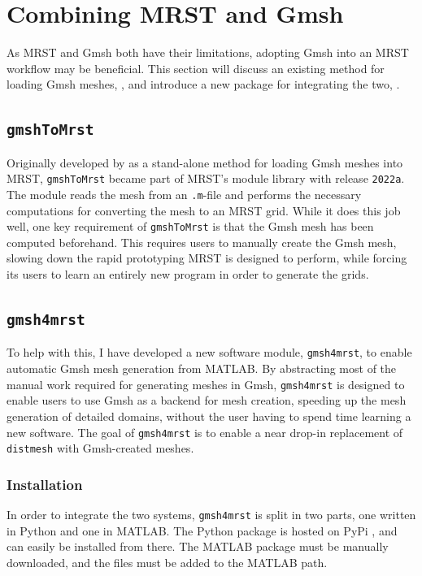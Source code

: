 \section{Combining MRST and Gmsh}
\label{sec:combining}
As MRST and Gmsh both have their limitations, adopting Gmsh into an MRST workflow may be beneficial. This section will discuss an existing method for loading Gmsh meshes, , and introduce a new package for integrating the two, .

\subsection{\texttt{gmshToMrst}}
\label{sec:GmshToMRST}
Originally developed by \textcite{gmsh_to_mrst} as a stand-alone method for loading Gmsh meshes into MRST, \verb|gmshToMrst| became part of MRST's module library with release \verb|2022a|. The module reads the mesh from an \verb|.m|-file and performs the necessary computations for converting the mesh to an MRST grid. While it does this job well, one key requirement of \verb|gmshToMrst| is that the Gmsh mesh has been computed beforehand. This requires users to manually create the Gmsh mesh, slowing down the rapid prototyping MRST is designed to perform, while forcing its users to learn an entirely new program in order to generate the grids.


\subsection{\texttt{gmsh4mrst}}
\label{sec:own_software}
To help with this, I have developed a new software module, \verb|gmsh4mrst|, to enable automatic Gmsh mesh generation from MATLAB. By abstracting most of the manual work required for generating meshes in Gmsh, \verb|gmsh4mrst| is designed to enable users to use Gmsh as a backend for mesh creation, speeding up the mesh generation of detailed domains, without the user having to spend time learning a new software. The goal of \verb|gmsh4mrst| is to enable a near drop-in replacement of \verb|distmesh| with Gmsh-created meshes.


\subsubsection{Installation}
In order to integrate the two systems, \verb|gmsh4mrst| is split in two parts, one written in Python and one in MATLAB. The Python package is hosted on PyPi \cite{gmsh4mrst}, and can easily be installed from there. The MATLAB package must be manually downloaded, and the files must be added to the MATLAB path.

